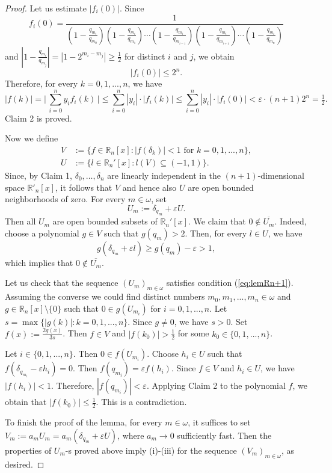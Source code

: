\documentclass[10pt,a4paper]{amsart}
\def\om{\omega}
\newcommand{\IR}{\mathbb{R}}
\newcommand{\e}{\varepsilon}
\newcommand{\w}{\omega}
\begin{document}
\begin{proof}
Let us estimate $|f_i(0)|$. Since
\[
f_i(0) =\frac{1}
{(1-\frac{q_{m_i}}{q_{m_0}})(1-\frac{q_{m_i}}{q_{m_1}})\cdots(1-\frac{q_{m_i}}{ q_{m_{i-1}}})(1-\frac{q_{m_i}}{q_{m_{i+1}}})\cdots(1-\frac{q_{m_i}}{q_{m_{n}}})}
\]
and $|1-\tfrac{q_{m_i}}{q_{m_j}}|=|1-2^{m_i-m_j}|\geq \frac{1}{2}$ for distinct $i$ and $j$, we obtain
\[
|f_i(0)|\leq 2^{n}.
\]
Therefore, for every $k=0,1,...,n$, we have
\[
|f(k)| = \Big|\, \sum_{i=0}^n y_i f_i(k) \,\Big| \leq \sum_{i=0}^n |y_i| \cdot|f_i(k)| \leq \sum_{i=0}^n |y_i|\cdot |f_i(0)| < \e \cdot (n+1) 2^n
= \tfrac{1}{2}.
\]
Claim 2 is proved.
\smallskip

Now we define
\begin{align*}
V  &:= \big\{ f\in \IR_n[x] : |f(\delta_k)|<1 \text{ for }k=0,1,...,n\big\},
\\
U &:= \big\{ l\in \IR_n'[x] : l(V) \subseteq (-1,1) \big\}.
\end{align*}
Since, by Claim 1,  $\delta_0,\dots,\delta_n$ are linearly independent in the $(n+1)$-dimensional space $\IR'_n[x]$, it follows that $V$ and hence also $U$ are open bounded neighborhoods of zero. For every $m\in\w$, set
\[
U_m := \delta_{q_m} + \e U.
\]
Then all $U_m$ are open bounded subsets of $\IR_n'[x]$. We claim that $0\not\in\overline{U_m}$. Indeed, choose a polynomial $g\in V$ such that $g(q_m)>2$. Then, for every $l\in U$, we have
\[
g(\delta_{q_m} + \e l)\geq g(q_m)-\e>1,
\]
which implies that $0\not\in\overline{U_m}$.

Let us check that the sequence $(U_m)_{m\in\om}$ satisfies condition (\ref{eq:lemRn+1}).
Assuming the converse we could find distinct numbers $m_0,m_1,...,m_n\in\w$ and $g\in \IR_n[x]\setminus\{0\}$ such that $0\in g(U_{m_i})$ for $i=0,1,...,n$.
Let $s=\max \{|g(k)|:k=0,1,...,n\}$. Since $g\neq 0$, we have $s>0$. Set $f(x):= \tfrac{2g(x)}{3s}$.
Then $f\in V$ and $|f(k_0)|>\tfrac{1}{2}$ for some $k_0\in \{0,1,...,n\}$.

Let $i\in\{0,1,...,n\}$. Then $0\in f(U_{m_i})$. Choose $h_i\in U$ such that $f(\delta_{q_{m_i}}-\e h_i)=0$. Then $f(q_{m_i})=\e f(h_i)$. Since $f\in V$ and $h_i\in U$, we have $|f(h_i)|< 1$. Therefore, $|f(q_{m_i})|<\e$. Applying Claim 2 to the polynomial $f$, we obtain  that $|f(k_0)|\leq \tfrac{1}{2}$. This is a contradiction.
\smallskip

To finish the proof of the lemma, for every $m\in\w$,  it suffices to set $V_m:= a_m U_m = a_m(\delta_{q_m} + \e U)$, where $a_m\to 0$ sufficiently fast. Then the properties of $U_m$-s proved above imply (i)-(iii) for the sequence  $(V_m)_{m\in \w}$, as desired.
\end{proof}
\end{document}
